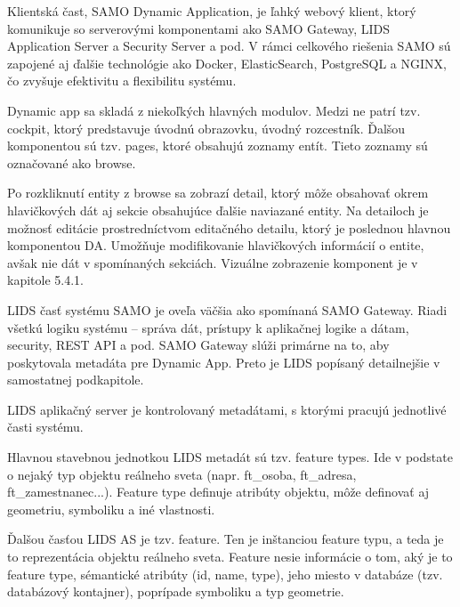 


Klientská čast, SAMO Dynamic Application, je ľahký webový klient, ktorý komunikuje so serverovými komponentami ako SAMO Gateway, LIDS Application Server a Security Server a pod. V rámci celkového riešenia SAMO sú zapojené aj ďalšie technológie ako Docker, ElasticSearch, PostgreSQL a NGINX, čo zvyšuje efektivitu a flexibilitu systému.

Dynamic app sa skladá z niekoľkých hlavných modulov. Medzi ne patrí tzv. cockpit, ktorý predstavuje úvodnú obrazovku, úvodný rozcestník. Ďalšou komponentou sú tzv. pages, ktoré obsahujú zoznamy entít. Tieto zoznamy sú označované ako browse. 

Po rozkliknutí entity z browse sa zobrazí detail, ktorý môže obsahovať okrem hlavičkových dát aj sekcie obsahujúce ďalšie naviazané entity. Na detailoch je možnosť editácie prostredníctvom editačného detailu,  ktorý je poslednou hlavnou komponentou DA. Umožňuje modifikovanie hlavičkových informácií o entite, avšak nie dát v spomínaných sekciách. Vizuálne zobrazenie komponent je v kapitole 5.4.1.



LIDS časť systému SAMO je oveľa väčšia ako spomínaná SAMO Gateway. Riadi všetkú logiku systému -- správa dát, prístupy k aplikačnej logike a dátam, security, REST API a pod. SAMO Gateway slúži primárne na to, aby poskytovala metadáta pre Dynamic App. Preto je LIDS popísaný detailnejšie v samostatnej podkapitole.

LIDS aplikačný server je kontrolovaný metadátami, s ktorými pracujú jednotlivé časti systému. 

Hlavnou stavebnou jednotkou LIDS metadát sú tzv. feature types. Ide v podstate o nejaký typ objektu reálneho sveta (napr. ft\_osoba, ft\_adresa, ft\_zamestnanec...). Feature type definuje atribúty objektu, môže definovať aj geometriu, symboliku a iné vlastnosti.

Ďalšou časťou LIDS AS je tzv. feature. Ten je inštanciou feature typu, a teda je to reprezentácia objektu reálneho sveta. Feature nesie informácie o tom, aký je to feature type, sémantické atribúty (id, name, type), jeho miesto v databáze (tzv. databázový kontajner), poprípade symboliku a typ geometrie.

